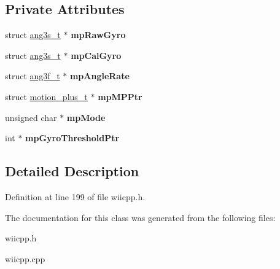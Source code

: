 \subsection*{Private Attributes}
\begin{DoxyCompactItemize}
\item 
\hypertarget{class_c_gyroscope_a87e3c3237cf9aa647616a3c6a67383d4}{struct \hyperlink{structang3s__t}{ang3s\-\_\-t} $\ast$ {\bfseries mp\-Raw\-Gyro}}\label{class_c_gyroscope_a87e3c3237cf9aa647616a3c6a67383d4}

\item 
\hypertarget{class_c_gyroscope_aa97fedb5d9e31d7e6cc490b93cdf10be}{struct \hyperlink{structang3s__t}{ang3s\-\_\-t} $\ast$ {\bfseries mp\-Cal\-Gyro}}\label{class_c_gyroscope_aa97fedb5d9e31d7e6cc490b93cdf10be}

\item 
\hypertarget{class_c_gyroscope_ad854fd374a9b1bf8583c5c8442f9eb82}{struct \hyperlink{structang3f__t}{ang3f\-\_\-t} $\ast$ {\bfseries mp\-Angle\-Rate}}\label{class_c_gyroscope_ad854fd374a9b1bf8583c5c8442f9eb82}

\item 
\hypertarget{class_c_gyroscope_a2529dbb80ed6023c5def2da858fa604b}{struct \hyperlink{structmotion__plus__t}{motion\-\_\-plus\-\_\-t} $\ast$ {\bfseries mp\-M\-P\-Ptr}}\label{class_c_gyroscope_a2529dbb80ed6023c5def2da858fa604b}

\item 
\hypertarget{class_c_gyroscope_a13027f2e9c9df3b0141b44e8704ca99c}{unsigned char $\ast$ {\bfseries mp\-Mode}}\label{class_c_gyroscope_a13027f2e9c9df3b0141b44e8704ca99c}

\item 
\hypertarget{class_c_gyroscope_ab3dad4aa924f4e2127116e5b236e4897}{int $\ast$ {\bfseries mp\-Gyro\-Threshold\-Ptr}}\label{class_c_gyroscope_ab3dad4aa924f4e2127116e5b236e4897}

\end{DoxyCompactItemize}


\subsection{Detailed Description}


Definition at line 199 of file wiicpp.\-h.



The documentation for this class was generated from the following files\-:\begin{DoxyCompactItemize}
\item 
wiicpp.\-h\item 
wiicpp.\-cpp\end{DoxyCompactItemize}
